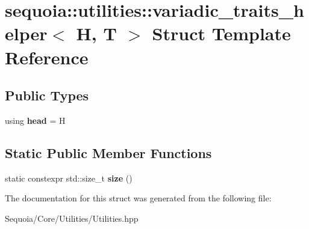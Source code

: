 \hypertarget{structsequoia_1_1utilities_1_1variadic__traits__helper}{}\section{sequoia\+::utilities\+::variadic\+\_\+traits\+\_\+helper$<$ H, T $>$ Struct Template Reference}
\label{structsequoia_1_1utilities_1_1variadic__traits__helper}
\subsection*{Public Types}
\begin{DoxyCompactItemize}
\item 
\mbox{\label{structsequoia_1_1utilities_1_1variadic__traits__helper_a0f42012d85573797c555feee3bc38c8a}} 
using {\bfseries head} = H
\end{DoxyCompactItemize}
\subsection*{Static Public Member Functions}
\begin{DoxyCompactItemize}
\item 
\mbox{\label{structsequoia_1_1utilities_1_1variadic__traits__helper_ab3c7757abf443109ea4023131736a5e3}} 
static constexpr std\+::size\+\_\+t {\bfseries size} ()
\end{DoxyCompactItemize}


The documentation for this struct was generated from the following file\+:\begin{DoxyCompactItemize}
\item 
Sequoia/\+Core/\+Utilities/Utilities.\+hpp\end{DoxyCompactItemize}
